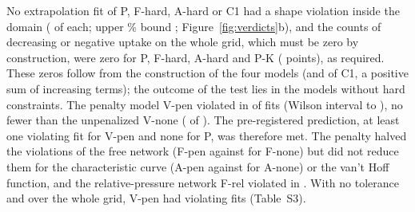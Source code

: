 \documentclass[journal=jcisd8,manuscript=article]{achemso}
\begin{document}
No extrapolation fit of P, F-hard, A-hard or C1 had a shape violation inside the domain ( of
 each; upper \% bound ; Figure~\ref{fig:verdicts}b), and the counts
of decreasing or negative uptake on the whole grid, which must be zero by construction, were zero for P, F-hard, A-hard
and P-K ( points), as required. These zeros follow from the construction of the four models
(and of C1, a positive sum of increasing terms); the outcome of the test lies in the models without hard constraints. The penalty model V-pen
violated in  of  fits (Wilson interval  to ),
no fewer than the unpenalized V-none ( of ). The pre-registered prediction, at least one
violating fit for V-pen and none for P, was therefore met. The penalty halved the violations of the free network (F-pen  against
 for F-none) but did not reduce them for the characteristic curve (A-pen  against
 for A-none) or the van't Hoff function, and the relative-pressure network F-rel violated in
. With no tolerance and over the
whole grid, V-pen had  violating fits (Table~S3).
\end{document}
